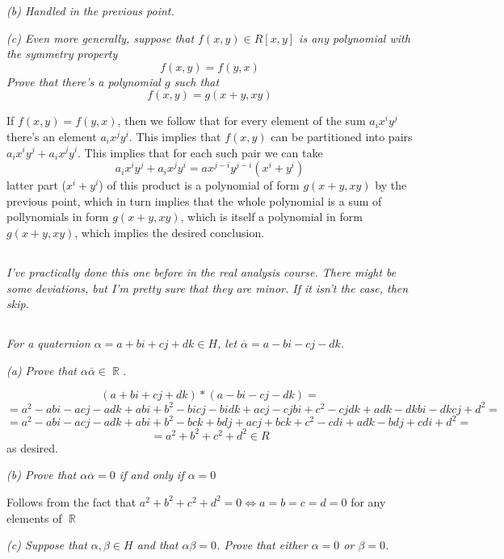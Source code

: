 \documentclass[11pt,oneside,titlepage]{book}
\DeclareMathOperator \real {\mathbb {R}}
\DeclareMathOperator \lra {\Leftrightarrow}
\begin{document}
\textit{(b) Handled in the previous point.}

\textit{(c) Even more generally, suppose that $f(x, y) \in R[x, y]$ is
any polynomial with the symmetry property
  $$f(x, y) = f(y, x)$$
  Prove that there's a polynomial $g$ such that
  $$f(x, y) = g(x + y, xy)$$}

If $f(x, y) = f(y, x)$, then we follow that for every element of the
sum $a_i x^i y^j$ there's an element $a_i x^j y^i$. This implies that
$f(x, y)$ can be partitioned into pairs $a_i x^i y^j + a_i x^j
y^i$. This implies that for each such pair we can take
$$a_i x^i y^j + a_i x^j y^i = a x^{j - i}y^{j - i}(x^i + y^i)$$
latter part ($x^i + y^i$) of this product is a polynomial of form $g(x
+ y, xy)$ by the previous point, which in turn implies that the whole
polynomial is a sum of pollynomials in form $g(x + y, xy)$, which is
itself a polynomial in form $g(x + y, xy)$, which implies the desired
conclusion.

\subsection{}

\textit{I've practically done this one before in the real analysis
course. There might be some deviations, but I'm pretty sure that they
are minor.  If it isn't the case, then skip.}

\subsection{}

\textit{For a quaternion $\alpha = a + bi + cj + dk \in H$, let
$\overline \alpha = a - bi - cj - dk$. }

\textit{(a) Prove that $\alpha \overline \alpha \in \real$.}

$$(a + bi + cj + dk) * (a - bi - cj - dk) = $$
$$ = 
a^2 - abi - acj - adk + abi + b^2 - bicj - bidk + acj - cjbi + c^2 -
cjdk + adk - dkbi - dkcj + d^2 = $$
$$ = 
a^2 - abi - acj - adk + abi + b^2 - bck + bdj + acj + bck + c^2 - cdi
+ adk - bdj + cdi + d^2 = $$
$$ =  a^2 + b^2  + c^2 + d^2 \in R$$
as desired.

\textit{(b) Prove that $\alpha \overline \alpha = 0$ if and only if
$\alpha = 0$}

Follows from the fact that $a^2 + b^2 + c^2 + d^2 = 0 \lra a = b = c =
d = 0$ for any elements of $\real$

\textit{(c) Suppose that $\alpha, \beta \in H$ and that $\alpha \beta
= 0$. Prove that either $\alpha = 0$ or $\beta = 0$.}
\end{document}
